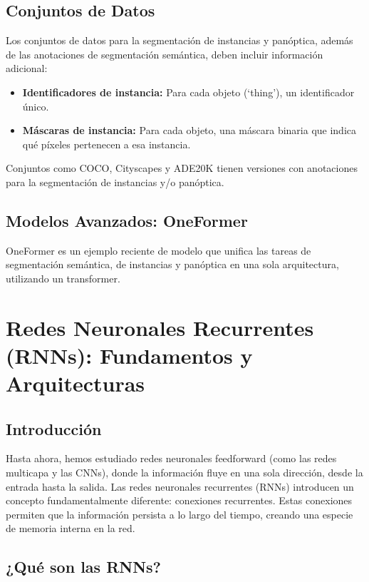 \documentclass{article}
\begin{document}
\subsection{Conjuntos de Datos}
Los conjuntos de datos para la segmentación de instancias y panóptica, además de las anotaciones de segmentación semántica, deben incluir información adicional:

\begin{itemize}
   \item \textbf{Identificadores de instancia:} Para cada objeto (`thing'), un identificador único.
   \item \textbf{Máscaras de instancia:} Para cada objeto, una máscara binaria que indica qué píxeles pertenecen a esa instancia.
\end{itemize}

Conjuntos como COCO, Cityscapes y ADE20K tienen versiones con anotaciones para la segmentación de instancias y/o panóptica.

\subsection{Modelos Avanzados: OneFormer}
OneFormer es un ejemplo reciente de modelo que unifica las tareas de segmentación semántica, de instancias y panóptica en una sola arquitectura, utilizando un transformer.

\section{Redes Neuronales Recurrentes (RNNs): Fundamentos y Arquitecturas}

\subsection{Introducción}

Hasta ahora, hemos estudiado redes neuronales feedforward (como las redes multicapa y las CNNs), donde la información fluye en una sola dirección, desde la entrada hasta la salida.  Las redes neuronales recurrentes (RNNs) introducen un concepto fundamentalmente diferente: conexiones recurrentes.  Estas conexiones permiten que la información persista a lo largo del tiempo, creando una especie de memoria interna en la red.

\subsection{¿Qué son las RNNs?}
\end{document}

